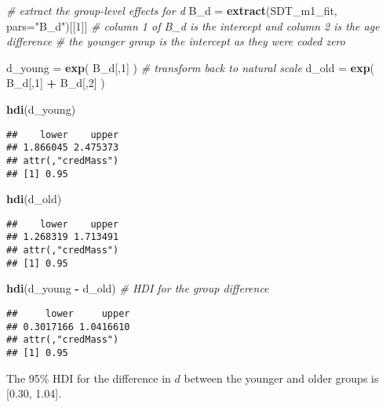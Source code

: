 \documentclass[
  english,
  ,man,floatsintext]{apa6}
\newenvironment{Shaded}{\begin{snugshade}}{\end{snugshade}}
\newcommand{\CommentTok}[1]{\textcolor[rgb]{0.56,0.35,0.01}{\textit{#1}}}
\newcommand{\DataTypeTok}[1]{\textcolor[rgb]{0.13,0.29,0.53}{#1}}
\newcommand{\DecValTok}[1]{\textcolor[rgb]{0.00,0.00,0.81}{#1}}
\newcommand{\KeywordTok}[1]{\textcolor[rgb]{0.13,0.29,0.53}{\textbf{#1}}}
\newcommand{\NormalTok}[1]{#1}
\newcommand{\OperatorTok}[1]{\textcolor[rgb]{0.81,0.36,0.00}{\textbf{#1}}}
\newcommand{\StringTok}[1]{\textcolor[rgb]{0.31,0.60,0.02}{#1}}
\begin{document}
\begin{Shaded}
\begin{Highlighting}[]
\CommentTok{# extract the group-level effects for d}
\NormalTok{B_d =}\StringTok{ }\KeywordTok{extract}\NormalTok{(SDT_m1_fit, }\DataTypeTok{pars=}\StringTok{"B_d"}\NormalTok{)[[}\DecValTok{1}\NormalTok{]]}
\CommentTok{# column 1 of B_d is the intercept and column 2 is the age difference}
\CommentTok{# the younger group is the intercept as they were coded zero}

\NormalTok{d_young =}\StringTok{ }\KeywordTok{exp}\NormalTok{( B_d[,}\DecValTok{1}\NormalTok{] ) }\CommentTok{# transform back to natural scale}
\NormalTok{d_old =}\StringTok{ }\KeywordTok{exp}\NormalTok{( B_d[,}\DecValTok{1}\NormalTok{] }\OperatorTok{+}\StringTok{ }\NormalTok{B_d[,}\DecValTok{2}\NormalTok{] )}

\KeywordTok{hdi}\NormalTok{(d_young)}
\end{Highlighting}
\end{Shaded}

\begin{verbatim}
##    lower    upper 
## 1.866045 2.475373 
## attr(,"credMass")
## [1] 0.95
\end{verbatim}

\begin{Shaded}
\begin{Highlighting}[]
\KeywordTok{hdi}\NormalTok{(d_old)}
\end{Highlighting}
\end{Shaded}

\begin{verbatim}
##    lower    upper 
## 1.268319 1.713491 
## attr(,"credMass")
## [1] 0.95
\end{verbatim}

\begin{Shaded}
\begin{Highlighting}[]
\KeywordTok{hdi}\NormalTok{(d_young }\OperatorTok{-}\StringTok{ }\NormalTok{d_old) }\CommentTok{# HDI for the group difference}
\end{Highlighting}
\end{Shaded}

\begin{verbatim}
##     lower     upper 
## 0.3017166 1.0416610 
## attr(,"credMass")
## [1] 0.95
\end{verbatim}

The 95\% HDI for the difference in \(d\) between the younger and older groups is {[}0.30, 1.04{]}.
\end{document}
